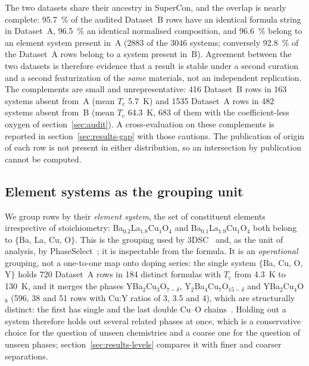 \documentclass{iopjournal}
\newcommand{\Tc}{T_{\mathrm c}}
\begin{document}
The two datasets share their ancestry in SuperCon, and the overlap is nearly complete:
\SI{95.7}{\percent} of the audited Dataset~B rows have an identical formula string in Dataset~A,
\SI{96.5}{\percent} an identical normalised composition, and \SI{96.6}{\percent} belong to an
element system present in~A (\num{2883} of the \num{3046} systems; conversely \SI{92.8}{\percent}
of the Dataset~A rows belong to a system present in~B). Agreement between the two datasets is
therefore evidence that a result is stable under a second curation and a second featurization of
the \emph{same} materials, not an independent replication. The complements are small and
unrepresentative: \num{416} Dataset~B rows in \num{163} systems absent from~A (mean $\Tc$
\SI{5.7}{\kelvin}) and \num{1535} Dataset~A rows in \num{482} systems absent from~B (mean $\Tc$
\SI{64.3}{\kelvin}, \num{683} of them with the coefficient-less oxygen of
section~\ref{sec:audit}). A cross-evaluation on these complements is reported in
section~\ref{sec:results-gap} with those cautions. The publication of origin of each row is not
present in either distribution, so an intersection by publication cannot be computed.

\subsection{Element systems as the grouping unit}
\label{sec:families}

We group rows by their \emph{element system}, the set of constituent elements irrespective of
stoichiometry: Ba$_{0.2}$La$_{1.8}$Cu$_{1}$O$_{4}$ and Ba$_{0.1}$La$_{1.9}$Cu$_{1}$O$_{4}$ both
belong to $\{$Ba, La, Cu, O$\}$. This is the grouping used by 3DSC~\cite{sommer2023} and, as the
unit of analysis, by PhaseSelect~\cite{vasylenko2023}; it is inspectable from the formula. It is an
\emph{operational} grouping, not a one-to-one map onto doping series: the single system
$\{$Ba, Cu, O, Y$\}$ holds \num{720} Dataset~A rows in \num{184} distinct formulas with $\Tc$ from
\SI{4.3}{\kelvin} to \SI{130}{\kelvin}, and it merges the phases YBa$_2$Cu$_3$O$_{7-\delta}$, Y$_2$Ba$_4$Cu$_7$O$_{15-\delta}$ and YBa$_2$Cu$_4$O$_8$
(\num{596}, \num{38} and \num{51} rows with Cu:Y ratios of \num{3}, \num{3.5} and \num{4}), which are structurally distinct: the first has single and the last double
Cu--O chains~\cite{gupta1993}. Holding out a system therefore holds out several related phases at once,
which is a conservative choice for the question of unseen chemistries and a coarse one for the
question of unseen phases; section~\ref{sec:results-levels} compares it with finer and coarser
separations.
\end{document}
